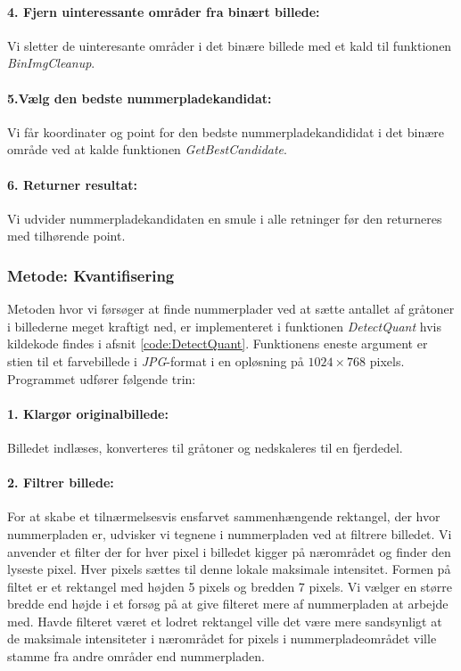 \paragraph{4. Fjern uinteressante områder fra binært billede:}
Vi sletter de uinteresante områder i det binære billede med et kald til funktionen \textit{BinImgCleanup}.

\paragraph{5.Vælg den bedste nummerpladekandidat:}
Vi får koordinater og point for den bedste nummerpladekandididat i det binære område ved at kalde funktionen \textit{GetBestCandidate}. 

\paragraph{6. Returner resultat:}
Vi udvider nummerpladekandidaten en smule i alle retninger før den returneres med tilhørende point.

\subsubsection{Metode: Kvantifisering}
Metoden hvor vi førsøger at finde nummerplader ved at sætte antallet af gråtoner i billederne meget kraftigt ned, er implementeret i funktionen \textit{DetectQuant} hvis kildekode findes i afsnit \vref{code:DetectQuant}. Funktionens eneste argument er stien til et farvebillede i \textit{JPG}-format i en opløsning på $1024 \times 768$ pixels. Programmet udfører følgende trin:

\paragraph{1. Klargør originalbillede:}
Billedet indlæses, konverteres til gråtoner og nedskaleres til en fjerdedel. 

\paragraph{2. Filtrer billede:}
For at skabe et tilnærmelsesvis ensfarvet sammenhængende rektangel, der hvor nummerpladen er, udvisker vi tegnene i nummerpladen ved at filtrere billedet. Vi anvender et filter der for hver pixel i billedet kigger på nærområdet og finder den lyseste pixel. Hver pixels sættes til denne lokale maksimale intensitet. Formen på filtet er et rektangel med højden 5 pixels og bredden 7 pixels. Vi vælger en større bredde end højde i et forsøg på at give filteret mere af  nummerpladen at arbejde med. Havde filteret været et lodret rektangel ville det være mere sandsynligt at de maksimale intensiteter i nærområdet for pixels i nummerpladeområdet ville stamme fra andre områder end nummerpladen.

